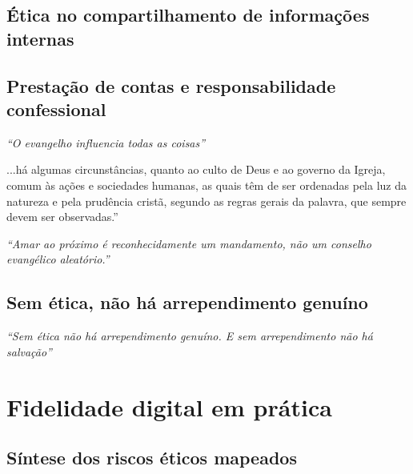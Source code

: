 \subsection{Ética no compartilhamento de informações internas}

\subsection{Prestação de contas e responsabilidade confessional}

\textit{“O evangelho influencia todas as coisas”} \cite[p. 56]{keller2014}

\begin{citacao}
...há algumas circunstâncias, quanto ao culto de Deus e ao governo da Igreja, comum às ações e sociedades humanas, as quais têm de ser ordenadas pela luz da natureza e pela prudência cristã, segundo as regras gerais da palavra, que sempre devem ser observadas.” \cite[Cap. I, § VI]{cfw}
\end{citacao}

\textit{“Amar ao próximo é reconhecidamente um mandamento, não um conselho evangélico aleatório.”} \cite[p. 745]{calvino2022}

\subsection{Sem ética, não há arrependimento genuíno}

\textit{“Sem ética não há arrependimento genuíno. E sem arrependimento não há salvação”} \cite[p. 102]{stott2008}

\section{Fidelidade digital em prática}

\subsection{Síntese dos riscos éticos mapeados}
